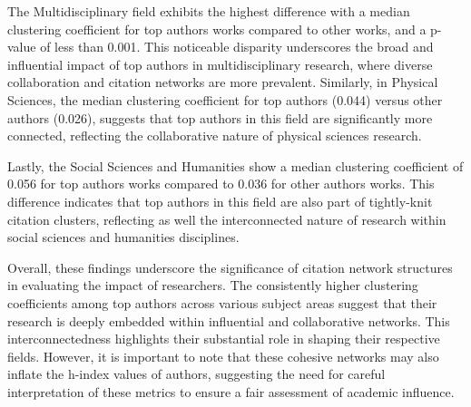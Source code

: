 The Multidisciplinary field exhibits the highest difference with a median
clustering coefficient for top authors works compared to other works, and a
p-value of less than 0.001. This noticeable disparity underscores the broad and
influential impact of top authors in multidisciplinary research, where diverse
collaboration and citation networks are more prevalent. Similarly, in Physical
Sciences, the median clustering coefficient for top authors (0.044) versus
other authors (0.026), suggests that top authors in this field are
significantly more connected, reflecting the collaborative nature of
physical sciences research.

Lastly, the Social Sciences and Humanities show a median clustering coefficient
of 0.056 for top authors works compared to 0.036 for other authors works. This
difference indicates that top authors in this field are also part of
tightly-knit citation clusters, reflecting as well the interconnected nature of
research within social sciences and humanities disciplines.

Overall, these findings underscore the significance of citation network
structures in evaluating the impact of researchers. The consistently
higher clustering coefficients among top authors across various subject areas
suggest that their research is deeply embedded within influential and
collaborative networks. This interconnectedness highlights their substantial
role in shaping their respective fields. However, it is important to note that
these cohesive networks may also inflate the h-index values of authors,
suggesting the need for careful interpretation of these metrics to ensure a
fair assessment of academic influence.